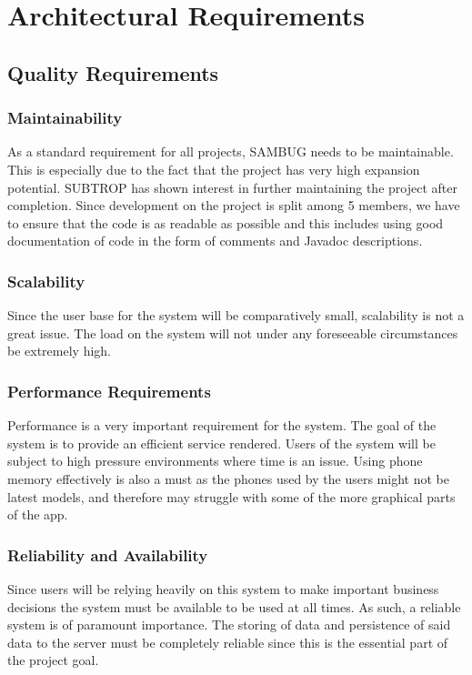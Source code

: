 \documentclass[11pt,a4paper,titlepage]{article}
\begin{document}
	
		
		
\section{Architectural Requirements}
	\subsection{Quality Requirements}
		\subsubsection{Maintainability}
			As a standard requirement for all projects, SAMBUG needs to be maintainable. This is especially due to the fact that the project has very high expansion potential. SUBTROP has shown interest in further maintaining the project after completion.
			Since development on the project is split among 5 members, we have to ensure that the code is as readable as possible and this includes using good documentation of code in the form of comments and Javadoc descriptions.
		\subsubsection{Scalability}
			Since the user base for the system will be comparatively small, scalability is not a great issue. The load on the system will not under any foreseeable circumstances be extremely high. 
		\subsubsection{Performance Requirements}
			Performance is a very important requirement for the system. The goal of the system is to provide an efficient service rendered. Users of the system will be subject to high pressure environments where time is an issue. Using phone memory effectively is also a must as the phones used by the users might not be latest models, and therefore may struggle with some of the more graphical parts of the app.
		\subsubsection{Reliability and Availability}
			Since users will be relying heavily on this system to make important business decisions the system must be available to be used at all times. As such, a reliable system is of paramount importance. The storing of data and persistence of said data to the server must be completely reliable since this is the essential part of the project goal.
\end{document}
